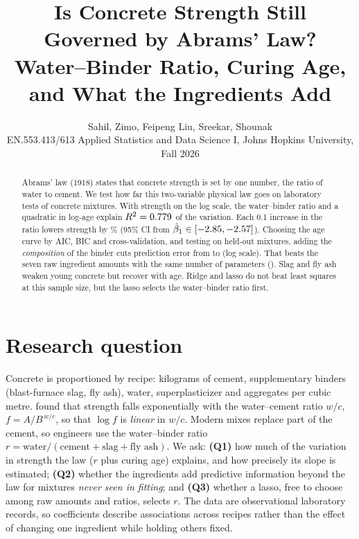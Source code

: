 \documentclass[11pt]{article}
\title{\vspace{-1.6cm}\textbf{Is Concrete Strength Still Governed by Abrams' Law?\\[2pt]
\large Water--Binder Ratio, Curing Age, and What the Ingredients Add}}
\author{Sahil, Zimo, Feipeng Liu, Sreekar, Shounak\\[2pt]
\small EN.553.413/613 Applied Statistics and Data Science I, Johns Hopkins University, Fall 2026}
\date{\vspace{-1.1cm}}
\newcommand{\wb}{r}
\begin{document}
\maketitle

\begin{abstract}
\noindent\small
Abrams' law (1918) states that concrete strength is set by one number, the ratio of water to cement. We test how far this two-variable physical law goes on \NObs{} laboratory tests of \NMix{} concrete mixtures. With strength on the log scale, the water--binder ratio and a quadratic in log-age explain $R^2=0.779$ of the variation. Each 0.1 increase in the ratio lowers strength by \PctPerTenth\% (95\% CI from $\hat\beta_1\in[-2.85,-2.57]$). Choosing the age curve by AIC, BIC and cross-validation, and testing on held-out mixtures, adding the \emph{composition} of the binder cuts prediction error from \TestWB{} to \TestWBplus{} (log scale). That beats the seven raw ingredient amounts with the same number of parameters (\TestIng). Slag and fly ash weaken young concrete but recover with age. Ridge and lasso do not beat least squares at this sample size, but the lasso selects the water--binder ratio first.
\end{abstract}

\section{Research question}
Concrete is proportioned by recipe: kilograms of cement, supplementary binders (blast-furnace slag, fly ash), water, superplasticizer and aggregates per cubic metre. \citet{abrams1918} found that strength falls exponentially with the water--cement ratio $w/c$, $f=A/B^{\,w/c}$, so that $\log f$ is \emph{linear} in $w/c$. Modern mixes replace part of the cement, so engineers use the water--binder ratio $\wb=\text{water}/(\text{cement}+\text{slag}+\text{fly ash})$. We ask: \textbf{(Q1)} how much of the variation in strength the law ($\wb$ plus curing age) explains, and how precisely its slope is estimated; \textbf{(Q2)} whether the ingredients add predictive information beyond the law for mixtures \emph{never seen in fitting}; and \textbf{(Q3)} whether a lasso, free to choose among raw amounts and ratios, selects $\wb$. The data are observational laboratory records, so coefficients describe associations across recipes rather than the effect of changing one ingredient while holding others fixed.
\end{document}
